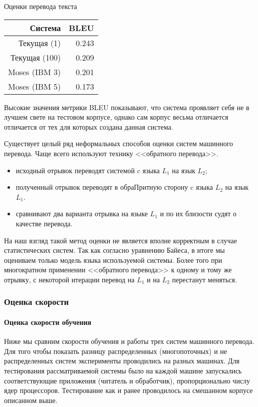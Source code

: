 \begin{dtable}{Оценки перевода текста}
	\begin{tabular}{|r|r|}
		\hline  \textbf{Система}	&	\textbf{BLEU}  \\ 
		\hline  Текущая (1)			&	0.243 \\ 
		\hline  Текущая (100)		&	0.209 \\ 
		\hline  Moses (IBM 3)		&	0.201 \\ 
		\hline  Moses (IBM 5) 		& 	0.173 \\ 
		\hline 
	\end{tabular} 
\end{dtable}

Высокие значения метрики BLEU показывают, что система проявляет 
себя не в лучшем свете на тестовом корпусе, однако сам корпус
весьма отличается отличается от тех для которых создана данная система.

Существует целый ряд неформальных способов оценки систем машинного перевода.
Чаще всего используют технику <<обратного перевода>>. 
\begin{itemize}
	\item исходный отрывок переводят системой c языка $L_1$ на язык $L_2$;
	\item полученный отрывок переводят в обраПритную сторону c языка $L_2$ на язык $L_1$.
	\item сравнивают два варианта отрывка на языке 	$L_1$ и по их близости судят о качестве перевода.
\end{itemize}
На наш взгляд такой метод оценки не является вполне корректным в случае статистических систем.
Так как согласно уравнению Байеса, в итоге мы оцениваем только модель языка используемой системы.
Более того при многократном применении <<обратного перевода>> к одному и тому же отрывку,
с некоторой итерации перевод на $L_1$ и на $L_2$ перестанут меняться.

\pagebreak

\subsubsection{Оценка скорости}

\paragraph{Оценка скорости обучения}

Ниже мы сравним скорости обучения и работы трех систем машинного перевода.
Для того чтобы показать разницу распределенных (многопоточных) и не распределенных систем
эксперименты проводились на разных машинах.
Для тестирования рассматриваемой системы было на каждой машине запускались 
соответствующие приложения (читатель и обработчик), пропорционально числу ядер процессоров.
Тестирование как и ранее проводилось на смешанном корпусе описанном выше.

